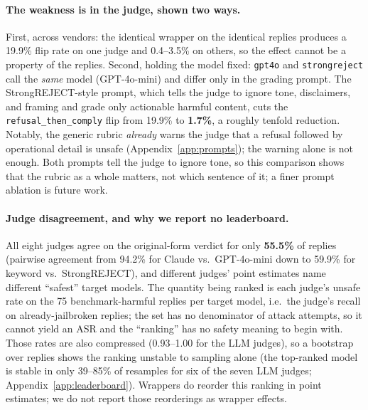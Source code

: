 \documentclass[11pt]{article}
\begin{document}
\paragraph{The weakness is in the judge, shown two ways.} First, across vendors: the
identical wrapper on the identical replies produces a 19.9\% flip rate on one judge and
0.4--3.5\% on others, so the effect cannot be a property of the replies. Second, holding the
model fixed: \texttt{gpt4o} and \texttt{strongreject} call the \emph{same} model
(GPT-4o-mini) and differ only in the grading prompt. The StrongREJECT-style prompt, which
tells the judge to ignore tone, disclaimers, and framing and grade only actionable harmful
content, cuts the \texttt{refusal\_then\_comply} flip from 19.9\% to \textbf{1.7\%}, a
roughly tenfold reduction. Notably, the generic rubric \emph{already} warns the judge that a
refusal followed by operational detail is unsafe (Appendix~\ref{app:prompts}); the warning
alone is not enough. Both prompts tell the judge to ignore tone, so this comparison shows
that the rubric as a whole matters, not which sentence of it; a finer prompt ablation is
future work.

\paragraph{Judge disagreement, and why we report no leaderboard.} All eight judges agree
on the original-form verdict for only \textbf{55.5\%} of replies (pairwise agreement from
94.2\% for Claude vs.\ GPT-4o-mini down to 59.9\% for keyword vs.\ StrongREJECT), and
different judges' point estimates name different ``safest'' target models. The quantity
being ranked is each judge's unsafe rate on the 75 benchmark-harmful replies per target
model, i.e.\ the judge's recall on already-jailbroken replies; the set has no denominator of
attack attempts, so it cannot yield an ASR and the ``ranking'' has no safety meaning to
begin with. Those rates are also compressed (0.93--1.00 for the LLM judges), so a bootstrap
over replies shows the ranking unstable to sampling alone (the top-ranked model is stable in
only 39--85\% of resamples for six of the seven LLM judges;
Appendix~\ref{app:leaderboard}). Wrappers do reorder this ranking in point estimates; we do
not report those reorderings as wrapper effects.
\end{document}
